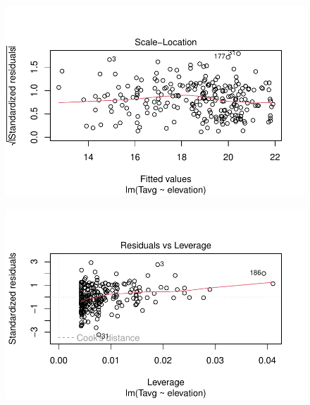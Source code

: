 \documentclass[
  letterpaper,
  DIV=11,
  numbers=noendperiod]{scrreprt}
\begin{document}
\begin{figure}[H]

{\centering \includegraphics{01_RegresionLineal_files/figure-pdf/unnamed-chunk-16-3.pdf}

}

\end{figure}

\begin{figure}[H]

{\centering \includegraphics{01_RegresionLineal_files/figure-pdf/unnamed-chunk-16-4.pdf}

}

\end{figure}
\end{document}
